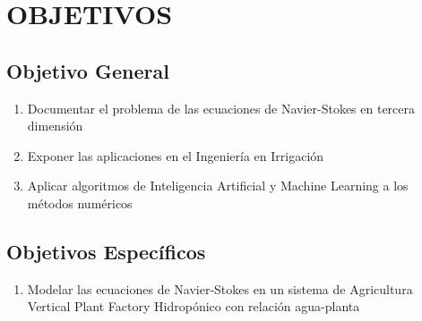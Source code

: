 \chapter{OBJETIVOS}

\section{Objetivo General}
\begin{enumerate}
    \item Documentar el problema de las ecuaciones de Navier-Stokes en tercera dimensión
    \item Exponer las aplicaciones en el Ingeniería en Irrigación
    \item Aplicar algoritmos de Inteligencia Artificial y Machine Learning a los métodos numéricos
\end{enumerate}
\section{Objetivos Específicos}

\begin{enumerate}
    \item Modelar las ecuaciones de Navier-Stokes en un sistema de Agricultura Vertical Plant Factory Hidropónico con relación agua-planta
\end{enumerate}




